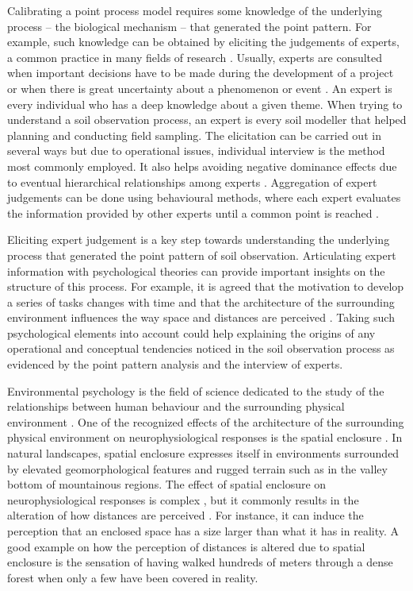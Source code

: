 Calibrating a point process model requires some knowledge of the underlying process -- the biological 
mechanism -- that generated the point pattern. For example, such knowledge can be obtained by eliciting the 
judgements of experts, a common practice in many fields of research \cite{OHaganEtAl2006}. Usually, experts 
are consulted when important decisions have to be made during the development of a project or when there is 
great uncertainty about a phenomenon or event \cite{MeyerEtAl2001}. An expert is every individual who has a 
deep knowledge about a given theme. When trying to understand a soil observation process, an expert is every 
soil modeller that helped planning and conducting field sampling. The elicitation can be carried out in 
several ways \cite{Cooke1991, MeyerEtAl2001, OHaganEtAl2006} but due to operational issues, individual 
interview is the method most commonly employed. It also helps avoiding negative dominance effects due to 
eventual hierarchical relationships among experts \cite{Cooke1991}. Aggregation of expert judgements can be 
done using behavioural methods, where each expert evaluates the information provided by other experts until a 
common point is reached \cite{OrsiEtAl2011}.

Eliciting expert judgement is a key step towards understanding the underlying process that generated the point 
pattern of soil observation. Articulating expert information with psychological theories can provide important 
insights on the structure of this process. For example, it is agreed that the motivation to develop a series 
of tasks changes with time \cite{BonezziEtAl2011, Toure-TilleryEtAl2011a} and that the architecture of the 
surrounding environment influences the way space and distances are perceived \cite{Coeterier1994, 
EpsteinEtAl1998}. Taking such psychological elements into account could help explaining the origins of any
operational and conceptual tendencies noticed in the soil observation process as evidenced by the point 
pattern analysis and the interview of experts.

Environmental psychology is the field of science dedicated to the study of the relationships between human 
behaviour and the surrounding physical environment \cite{BonnesEtAl2002}. One of the recognized effects of the 
architecture of the surrounding physical environment on neurophysiological responses is the spatial enclosure 
\cite{EpsteinEtAl1998}. In natural landscapes, spatial enclosure expresses itself in environments surrounded by
elevated geomorphological features and rugged terrain such as in the valley bottom of mountainous regions. The 
effect of spatial enclosure on neurophysiological responses is complex \cite{StampsEtAl2004}, but it commonly 
results in the alteration of how distances are perceived \cite{Coeterier1994}. For instance, it can induce the 
perception that an enclosed space has a size larger than what it has in reality. A good example on how the 
perception of distances is altered due to spatial enclosure is the sensation of having walked hundreds of 
meters through a dense forest when only a few have been covered in reality.

